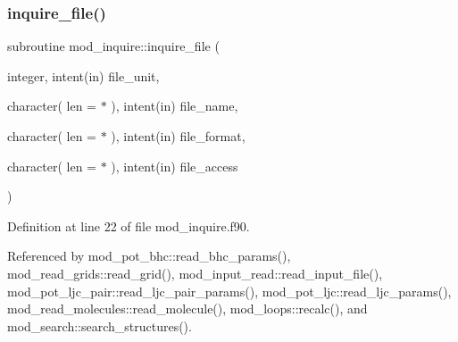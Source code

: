 \subsubsection{\texorpdfstring{inquire\+\_\+file()}{inquire\_file()}}
{\footnotesize\ttfamily subroutine mod\+\_\+inquire\+::inquire\+\_\+file (\begin{DoxyParamCaption}\item[{integer, intent(in)}]{file\+\_\+unit,  }\item[{character( len = $\ast$ ), intent(in)}]{file\+\_\+name,  }\item[{character( len = $\ast$ ), intent(in)}]{file\+\_\+format,  }\item[{character( len = $\ast$ ), intent(in)}]{file\+\_\+access }\end{DoxyParamCaption})}



Definition at line 22 of file mod\+\_\+inquire.\+f90.



Referenced by mod\+\_\+pot\+\_\+bhc\+::read\+\_\+bhc\+\_\+params(), mod\+\_\+read\+\_\+grids\+::read\+\_\+grid(), mod\+\_\+input\+\_\+read\+::read\+\_\+input\+\_\+file(), mod\+\_\+pot\+\_\+ljc\+\_\+pair\+::read\+\_\+ljc\+\_\+pair\+\_\+params(), mod\+\_\+pot\+\_\+ljc\+::read\+\_\+ljc\+\_\+params(), mod\+\_\+read\+\_\+molecules\+::read\+\_\+molecule(), mod\+\_\+loops\+::recalc(), and mod\+\_\+search\+::search\+\_\+structures().

